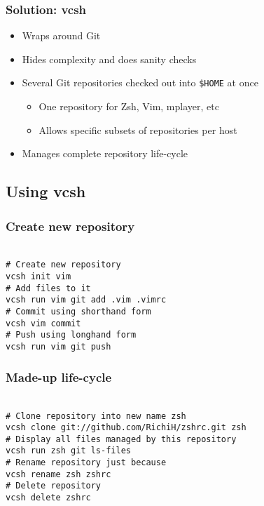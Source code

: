 \documentclass[t]{beamer}
\begin{document}
\begin{frame}
	\frametitle{Solution: vcsh}
	\begin{itemize}
		\item Wraps around Git
		\item Hides complexity and does sanity checks
		\item Several Git repositories checked out into \texttt{\$HOME} at once
		\begin{itemize}
			\item One repository for Zsh, Vim, mplayer, etc
			\item Allows specific subsets of repositories per host
		\end{itemize}
		\item Manages complete repository life-cycle
	\end{itemize}
\end{frame}

\subsection{Using vcsh}

\begin{frame}
	\frametitle{Create new repository}
	\texttt{ \\
		\# Create new repository \\
		vcsh init vim \\
		\# Add files to it \\
		vcsh run vim git add .vim .vimrc \\
		\# Commit using shorthand form \\
		vcsh vim commit \\
		\# Push using longhand form \\
		vcsh run vim git push
	}
\end{frame}

\begin{frame}
	\frametitle{Made-up life-cycle}
	\texttt{ \\
		\# Clone repository into new name zsh \\
		vcsh clone git://github.com/RichiH/zshrc.git zsh \\
		\# Display all files managed by this repository \\
		vcsh run zsh git ls-files \\
		\# Rename repository just because \\
		vcsh rename zsh zshrc \\
		\# Delete repository \\
		vcsh delete zshrc
	}
\end{frame}
\end{document}
